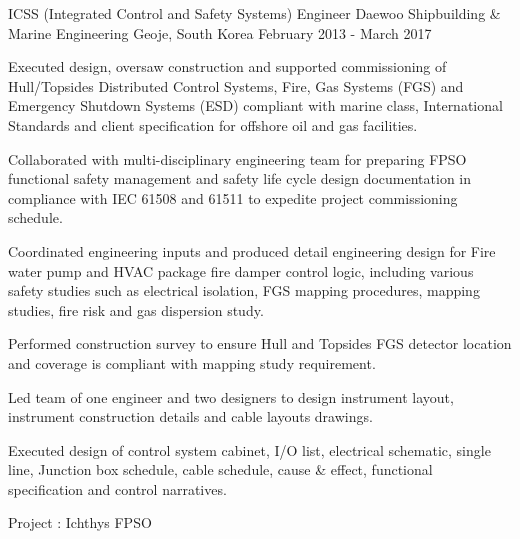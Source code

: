 \begin{cventries}
	\cventry
	{ICSS (Integrated Control and Safety Systems) Engineer} %
	{Daewoo Shipbuilding \& Marine Engineering} %
	{Geoje, South Korea} %
	{February 2013 - March 2017} %
	{ %
		\begin{cvitems}
			\item {Executed design, oversaw construction and supported commissioning of Hull/Topsides Distributed Control Systems, Fire, Gas Systems (FGS) and Emergency Shutdown Systems (ESD) compliant with marine class, International Standards and client specification for offshore oil and gas facilities.}
			\item {Collaborated with multi-disciplinary engineering team for preparing FPSO functional safety management and safety life cycle design documentation in compliance with IEC 61508 and 61511 to expedite project commissioning schedule.}
			\item {Coordinated engineering inputs and produced detail engineering design for Fire water pump and HVAC package fire damper control logic, including various safety studies such as electrical isolation, FGS mapping procedures, mapping studies, fire risk and gas dispersion study.}
			\item {Performed construction survey to ensure Hull and Topsides FGS detector location and coverage is compliant with mapping study requirement.}
			\item {Led team of one engineer and two designers to design instrument layout, instrument construction details and cable layouts drawings.}
			\item {Executed design of control system cabinet, I/O list, electrical schematic, single line, Junction box schedule, cable schedule, cause \& effect, functional specification and control narratives.}		
		\end{cvitems}
	}
	\cvprojentry
	{Project : }
	{Ichthys FPSO}
\end{cventries}

